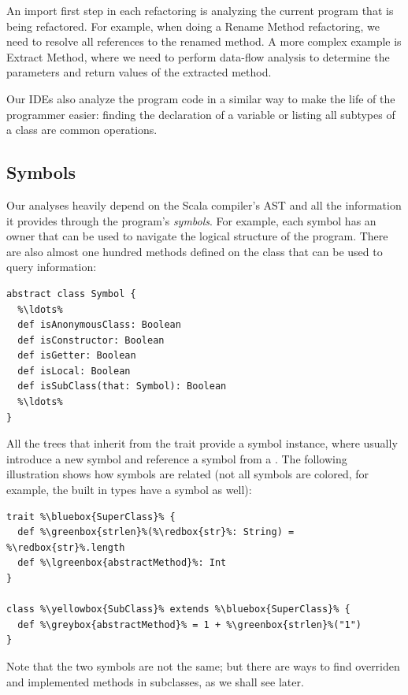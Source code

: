 An import first step in each refactoring is analyzing the current program that is being refactored. For example, when doing a Rename Method refactoring, we need to resolve all references to the renamed method. A more complex example is Extract Method, where we need to perform data-flow analysis to determine the parameters and return values of the extracted method.

Our IDEs also analyze the program code in a similar way to make the life of the programmer easier: finding the declaration of a variable or listing all subtypes of a class are common operations.

\subsection{Symbols}

Our analyses heavily depend on the Scala compiler's AST and all the information it provides through the program's \textit{symbols}. For example, each symbol has an owner that can be used to navigate the logical structure of the program. There are also almost one hundred  methods defined on the  class that can be used to query information:
\begin{lstlisting}
abstract class Symbol {
  %\ldots%
  def isAnonymousClass: Boolean
  def isConstructor: Boolean
  def isGetter: Boolean
  def isLocal: Boolean
  def isSubClass(that: Symbol): Boolean
  %\ldots%
}
\end{lstlisting}

All the trees that inherit from the  trait provide a symbol instance, where  usually introduce a new symbol and  reference a symbol from a . The following illustration shows how symbols are related (not all symbols are colored, for example, the built in types have a symbol as well):

\begin{lstlisting}
trait %\bluebox{SuperClass}% {
  def %\greenbox{strlen}%(%\redbox{str}%: String) = %\redbox{str}%.length
  def %\lgreenbox{abstractMethod}%: Int
}

class %\yellowbox{SubClass}% extends %\bluebox{SuperClass}% {
  def %\greybox{abstractMethod}% = 1 + %\greenbox{strlen}%("1")
}
\end{lstlisting}

Note that the two  symbols are not the same; but there are ways to find overriden and implemented methods in subclasses, as we shall see later.

